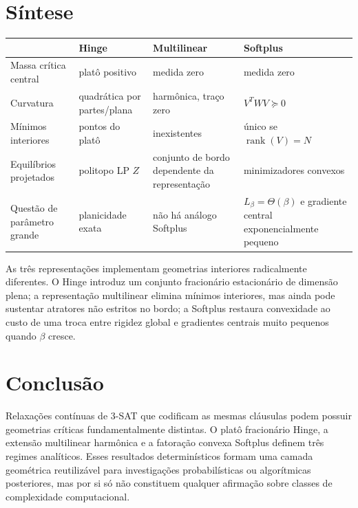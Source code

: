 \documentclass[11pt,a4paper]{article}
\begin{document}
\section{Síntese}
\begin{center}
\begin{tabularx}{\textwidth}{@{}lXXX@{}}
\toprule
& Hinge & Multilinear & Softplus\\
\midrule
Massa crítica central & platô positivo & medida zero & medida zero\\
Curvatura & quadrática por partes/plana & harmônica, traço zero & $V^TWV\succeq0$\\
Mínimos interiores & pontos do platô & inexistentes & único se $\operatorname{rank}(V)=N$\\
Equilíbrios projetados & politopo LP $Z$ & conjunto de bordo dependente da representação & minimizadores convexos\\
Questão de parâmetro grande & planicidade exata & não há análogo Softplus & $L_\beta=\Theta(\beta)$ e gradiente central exponencialmente pequeno\\
\bottomrule
\end{tabularx}
\end{center}

As três representações implementam geometrias interiores radicalmente diferentes. O Hinge introduz um conjunto fracionário estacionário de dimensão plena; a representação multilinear elimina mínimos interiores, mas ainda pode sustentar atratores não estritos no bordo; a Softplus restaura convexidade ao custo de uma troca entre rigidez global e gradientes centrais muito pequenos quando $\beta$ cresce.

\section{Conclusão}
Relaxações contínuas de 3-SAT que codificam as mesmas cláusulas podem possuir geometrias críticas fundamentalmente distintas. O platô fracionário Hinge, a extensão multilinear harmônica e a fatoração convexa Softplus definem três regimes analíticos. Esses resultados determinísticos formam uma camada geométrica reutilizável para investigações probabilísticas ou algorítmicas posteriores, mas por si só não constituem qualquer afirmação sobre classes de complexidade computacional.
\end{document}

